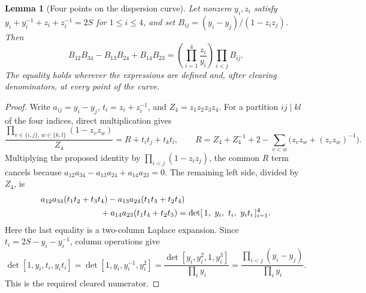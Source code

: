 \documentclass[11pt]{article}
\numberwithin{equation}{section}
\newtheorem{lemma}[theorem]{Lemma}
\theoremstyle{remark}\newtheorem{remark}[theorem]{Remark}
\begin{document}
\begin{lemma}[Four points on the dispersion curve]
Let nonzero $y_i,z_i$ satisfy
$y_i+y_i^{-1}+z_i+z_i^{-1}=2S$ for $1\le i\le4$, and set
$B_{ij}=(y_i-y_j)/(1-z_i z_j)$.  Then
\[
 B_{12}B_{34}-B_{13}B_{24}+B_{14}B_{23}
 =\left(\prod_{i=1}^4\frac{z_i}{y_i}\right)
   \prod_{i<j}B_{ij}.
\]
The equality holds wherever the expressions are defined and,
after clearing denominators, at every point of the curve.
\end{lemma}
\begin{proof}
Write $a_{ij}=y_i-y_j$, $t_i=z_i+z_i^{-1}$, and
$Z_4=z_1z_2z_3z_4$.  For a partition $ij\mid kl$ of the four
indices, direct multiplication gives
\[
 \frac{\prod_{v\in\{i,j\},\,w\in\{k,l\}}(1-z_vz_w)}{Z_4}
 =R+t_it_j+t_kt_l,
 \qquad
 R=Z_4+Z_4^{-1}+2-\sum_{v<w}
          \bigl(z_vz_w+(z_vz_w)^{-1}\bigr).
\]
Multiplying the proposed identity by
$\prod_{i<j}(1-z_i z_j)$, the common $R$ term cancels because
$a_{12}a_{34}-a_{13}a_{24}+a_{14}a_{23}=0$.
The remaining left side, divided by $Z_4$, is
\[
 \begin{split}
 &a_{12}a_{34}(t_1t_2+t_3t_4)
 -a_{13}a_{24}(t_1t_3+t_2t_4)\\
 &\hspace{25mm}+a_{14}a_{23}(t_1t_4+t_2t_3)
 =\det[\,1,\ y_i,\ t_i,\ y_it_i\,]_{i=1}^4.
 \end{split}
\]
Here the last equality is a two-column Laplace expansion.
Since $t_i=2S-y_i-y_i^{-1}$, column operations give
\[
 \det[1,y_i,t_i,y_it_i]
 =\det[1,y_i,y_i^{-1},y_i^2]
 =\frac{\det[y_i,y_i^2,1,y_i^3]}{\prod_i y_i}
 =\frac{\prod_{i<j}(y_i-y_j)}{\prod_i y_i}.
\]
This is the required cleared numerator.
\end{proof}
\end{document}
